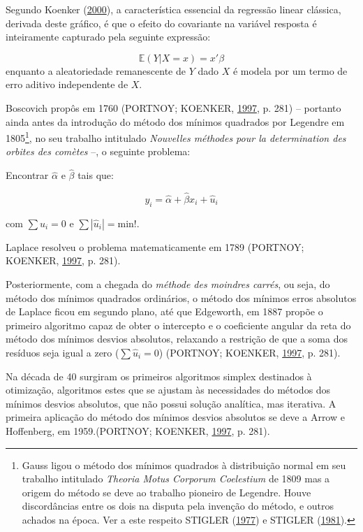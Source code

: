 \documentclass[a4paper, 12pt]{article}
\let\rmarkdownfootnote\footnote%
\def\footnote{\protect\rmarkdownfootnote}
\begin{document}
Segundo Koenker (\protect\hyperlink{ref-koenker2000}{2000}), a
característica essencial da regressão linear clássica, derivada deste
gráfico, é que o efeito do covariante na variável resposta é
inteiramente capturado pela seguinte expressão:

\[\mathbb{E}(Y|X = x) = x'\beta\] enquanto a aleatoriedade remanescente
de \(Y\) dado \(X\) é modela por um termo de erro aditivo independente
de \(X\).

Boscovich propôs em 1760 (PORTNOY; KOENKER,
\protect\hyperlink{ref-tortoise}{1997}, p. 281) -- portanto ainda antes
da introdução do método dos mínimos quadrados por Legendre em
1805\footnote{Gauss ligou o método dos mínimos quadrados à distribuição
  normal em seu trabalho intitulado \emph{Theoria Motus Corporum
  Coelestium} de 1809 mas a origem do método se deve ao trabalho
  pioneiro de Legendre. Houve discordâncias entre os dois na disputa
  pela invenção do método, e outros achados na época. Ver a este
  respeito STIGLER (\protect\hyperlink{ref-STIGLER197731}{1977}) e
  STIGLER (\protect\hyperlink{ref-stigler1981}{1981}).}, no seu trabalho
intitulado \emph{Nouvelles méthodes pour la determination des orbites
des comètes} --, o seguinte problema:

Encontrar \(\hat \alpha\) e \(\hat \beta\) tais que:

\[y_i = \hat \alpha + \hat \beta x_i + \hat u_i\]

com \(\sum \hat u_i = 0\) e \(\sum |\hat u_i| = \text{min!}\).

Laplace resolveu o problema matematicamente em 1789 (PORTNOY; KOENKER,
\protect\hyperlink{ref-tortoise}{1997}, p. 281).

Posteriormente, com a chegada do \emph{méthode des moindres carrés}, ou
seja, do método dos mínimos quadrados ordinários, o método dos mínimos
erros absolutos de Laplace ficou em segundo plano, até que Edgeworth, em
1887 propõe o primeiro algoritmo capaz de obter o intercepto e o
coeficiente angular da reta do método dos mínimos desvios absolutos,
relaxando a restrição de que a soma dos resíduos seja igual a zero
(\(\sum \hat u_i = 0\)) (PORTNOY; KOENKER,
\protect\hyperlink{ref-tortoise}{1997}, p. 281).

Na década de 40 surgiram os primeiros algoritmos simplex destinados à
otimização, algoritmos estes que se ajustam às necessidades do métodos
dos mínimos desvios absolutos, que não possui solução analítica, mas
iterativa. A primeira aplicação do método dos mínimos desvios absolutos
se deve a Arrow e Hoffenberg, em 1959.(PORTNOY; KOENKER,
\protect\hyperlink{ref-tortoise}{1997}, p. 281).
\end{document}
